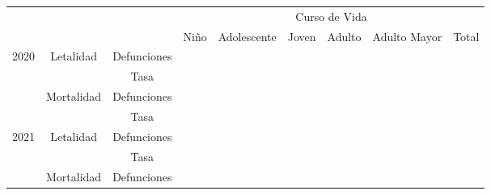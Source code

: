 
		\begin{tabular}{cccllllll}
			\cline{4-9}
			\multicolumn{1}{l}{} &
			&
			\multicolumn{1}{c|}{} &
			\multicolumn{6}{c|}{Curso de Vida} \\ \cline{4-9} 
			\multicolumn{1}{l}{} &
			\multicolumn{1}{l}{} &
			\multicolumn{1}{l|}{} &
			\multicolumn{1}{c|}{Niño} &
			\multicolumn{1}{c|}{Adolescente} &
			\multicolumn{1}{c|}{Joven} &
			\multicolumn{1}{c|}{Adulto} &
			\multicolumn{1}{c|}{Adulto Mayor} &
			\multicolumn{1}{c|}{Total} \\ \hline
			\multicolumn{1}{|c|}{\multirow{4}{*}{2020}} &
			\multicolumn{1}{c|}{\multirow{2}{*}{Letalidad}} &
			\multicolumn{1}{c|}{Defunciones} &
			\multicolumn{1}{c|}{} &
			\multicolumn{1}{c|}{} &
			\multicolumn{1}{c|}{} &
			\multicolumn{1}{c|}{} &
			\multicolumn{1}{l|}{} &
			\multicolumn{1}{l|}{} \\ \cline{3-9} 
			\multicolumn{1}{|c|}{} &
			\multicolumn{1}{c|}{} &
			\multicolumn{1}{c|}{Tasa} &
			\multicolumn{1}{c|}{} &
			\multicolumn{1}{c|}{} &
			\multicolumn{1}{c|}{} &
			\multicolumn{1}{c|}{} &
			\multicolumn{1}{l|}{} &
			\multicolumn{1}{l|}{} \\ \cline{2-9} 
			\multicolumn{1}{|c|}{} &
			\multicolumn{1}{c|}{\multirow{2}{*}{Mortalidad}} &
			\multicolumn{1}{c|}{Defunciones} &
			\multicolumn{1}{c|}{} &
			\multicolumn{1}{c|}{} &
			\multicolumn{1}{c|}{} &
			\multicolumn{1}{c|}{} &
			\multicolumn{1}{l|}{} &
			\multicolumn{1}{l|}{} \\ \cline{3-9} 
			\multicolumn{1}{|c|}{} &
			\multicolumn{1}{c|}{} &
			\multicolumn{1}{c|}{Tasa} &
			\multicolumn{1}{c|}{} &
			\multicolumn{1}{c|}{} &
			\multicolumn{1}{c|}{} &
			\multicolumn{1}{c|}{} &
			\multicolumn{1}{l|}{} &
			\multicolumn{1}{l|}{} \\ \hline
			\multicolumn{1}{|c|}{\multirow{4}{*}{2021}} &
			\multicolumn{1}{c|}{\multirow{2}{*}{Letalidad}} &
			\multicolumn{1}{c|}{Defunciones} &
			\multicolumn{1}{c|}{} &
			\multicolumn{1}{c|}{} &
			\multicolumn{1}{c|}{} &
			\multicolumn{1}{c|}{} &
			\multicolumn{1}{l|}{} &
			\multicolumn{1}{l|}{} \\ \cline{3-9} 
			\multicolumn{1}{|c|}{} &
			\multicolumn{1}{c|}{} &
			\multicolumn{1}{c|}{Tasa} &
			\multicolumn{1}{c|}{} &
			\multicolumn{1}{c|}{} &
			\multicolumn{1}{c|}{} &
			\multicolumn{1}{c|}{} &
			\multicolumn{1}{l|}{} &
			\multicolumn{1}{l|}{} \\ \cline{2-9} 
			\multicolumn{1}{|c|}{} &
			\multicolumn{1}{c|}{\multirow{2}{*}{Mortalidad}} &
			\multicolumn{1}{c|}{Defunciones} &

\end{tabular}
